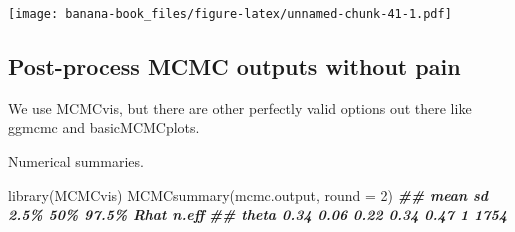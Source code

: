 \documentclass[
  12pt,
]{krantz}
\newenvironment{Shaded}{\begin{snugshade}}{\end{snugshade}}
\newcommand{\AttributeTok}[1]{\textcolor[rgb]{0.77,0.63,0.00}{#1}}
\newcommand{\DecValTok}[1]{\textcolor[rgb]{0.00,0.00,0.81}{#1}}
\newcommand{\DocumentationTok}[1]{\textcolor[rgb]{0.56,0.35,0.01}{\textbf{\textit{#1}}}}
\newcommand{\FunctionTok}[1]{\textcolor[rgb]{0.00,0.00,0.00}{#1}}
\newcommand{\NormalTok}[1]{#1}
\newcommand{\SpecialCharTok}[1]{\textcolor[rgb]{0.00,0.00,0.00}{#1}}
\begin{document}
\begin{Shaded}
\end{Shaded}

\begin{Shaded}
\end{Shaded}

\texttt{[image: banana-book\_files/figure-latex/unnamed-chunk-41-1.pdf]}

\hypertarget{post-process-mcmc-outputs-without-pain}{%
\subsection{Post-process MCMC outputs without pain}\label{post-process-mcmc-outputs-without-pain}}

We use MCMCvis, but there are other perfectly valid options out there like ggmcmc and basicMCMCplots.

Numerical summaries.

\begin{Shaded}
\begin{Highlighting}[]
\FunctionTok{library}\NormalTok{(MCMCvis)}
\FunctionTok{MCMCsummary}\NormalTok{(mcmc.output, }\AttributeTok{round =} \DecValTok{2}\NormalTok{)}
\DocumentationTok{\#\#       mean   sd 2.5\%  50\% 97.5\% Rhat n.eff}
\DocumentationTok{\#\# theta 0.34 0.06 0.22 0.34  0.47    1  1754}
\end{Highlighting}
\end{Shaded}
\end{document}
